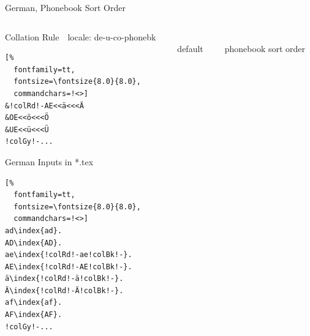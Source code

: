 \documentclass[aspectratio=169,10pt]{beamer}
\begin{document}

\setmonofont{Noto Sans Mono}
\begin{frame}[fragile]{German, Phonebook Sort Order}

\begin{columns}
\begin{column}{55mm}

\setmonofont{Noto Sans Mono}
\begin{block}{Collation Rule~~\scriptsize locale: de-u-co-phonebk}
\begin{Verbatim}[%
  fontfamily=tt,
  fontsize=\fontsize{8.0}{8.0},
  commandchars=!<>]
&!colRd!-AE<<ä<<<Ä
&OE<<ö<<<Ö
&UE<<ü<<<Ü
!colGy!-...
\end{Verbatim}
\end{block}
\begin{exampleblock}{German Inputs in *.tex}
\begin{Verbatim}[%
  fontfamily=tt,
  fontsize=\fontsize{8.0}{8.0},
  commandchars=!<>]
ad\index{ad}.
AD\index{AD}.
ae\index{!colRd!-ae!colBk!-}.
AE\index{!colRd!-AE!colBk!-}.
ä\index{!colRd!-ä!colBk!-}.
Ä\index{!colRd!-Ä!colBk!-}.
af\index{af}.
AF\index{AF}.
!colGy!-...
\end{Verbatim}
\end{exampleblock}
\end{column}

\begin{column}{38mm}
\begin{center}
\\[2mm]%
default
\end{center}
\end{column}

\begin{column}{38mm}
\begin{center}
\\[2mm]%
phonebook sort order
\end{center}
\end{column}
\end{columns}

\end{frame}

\end{document}
